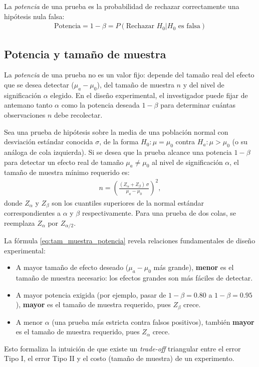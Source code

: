 \begin{observacion}
	La \emph{potencia} de una prueba es la probabilidad de rechazar correctamente una hipótesis nula falsa:
	\begin{align}
		\text{Potencia} = 1 - \beta = P(\text{Rechazar } H_0 | H_0 \text{ es falsa})
	\end{align}
\end{observacion}

\subsection{Potencia y tamaño de muestra}

La \emph{potencia} de una prueba no es un valor fijo: depende del tamaño real del efecto que se desea detectar ($\mu_a - \mu_0$), del tamaño de muestra $n$ y del nivel de significación $\alpha$ elegido. En el diseño experimental, el investigador puede fijar de antemano tanto $\alpha$ como la potencia deseada $1-\beta$ para determinar cuántas observaciones $n$ debe recolectar.

\begin{teorema}
	Sea una prueba de hipótesis sobre la media de una población normal con desviación estándar conocida $\sigma$, de la forma $H_0: \mu = \mu_0$ contra $H_a: \mu > \mu_0$ (o su análoga de cola izquierda). Si se desea que la prueba alcance una potencia $1-\beta$ para detectar un efecto real de tamaño $\mu_a \neq \mu_0$ al nivel de significación $\alpha$, el tamaño de muestra mínimo requerido es:
	\begin{align}
		n = \left( \frac{(Z_\alpha + Z_\beta)\, \sigma}{\mu_a - \mu_0} \right)^2,
		\label{eq:tam_muestra_potencia}
	\end{align}
	donde $Z_\alpha$ y $Z_\beta$ son los cuantiles superiores de la normal estándar correspondientes a $\alpha$ y $\beta$ respectivamente. Para una prueba de dos colas, se reemplaza $Z_\alpha$ por $Z_{\alpha/2}$.
\end{teorema}

\begin{observacion}
	La fórmula \eqref{eq:tam_muestra_potencia} revela relaciones fundamentales de diseño experimental:
	\begin{itemize}
		\item A mayor tamaño de efecto deseado ($\mu_a - \mu_0$ más grande), \textbf{menor} es el tamaño de muestra necesario: los efectos grandes son más fáciles de detectar.
		\item A mayor potencia exigida (por ejemplo, pasar de $1-\beta = 0.80$ a $1-\beta = 0.95$), \textbf{mayor} es el tamaño de muestra requerido, pues $Z_\beta$ crece.
		\item A menor $\alpha$ (una prueba más estricta contra falsos positivos), también \textbf{mayor} es el tamaño de muestra requerido, pues $Z_\alpha$ crece.
	\end{itemize}
	Esto formaliza la intuición de que existe un \emph{trade-off} triangular entre el error Tipo I, el error Tipo II y el costo (tamaño de muestra) de un experimento.
\end{observacion}


